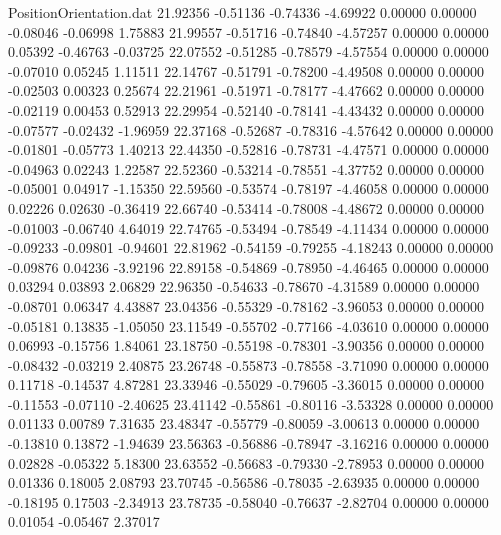 \begin{filecontents}{PositionOrientation.dat}
  21.92356   -0.51136   -0.74336    -4.69922    0.00000    0.00000   -0.08046   -0.06998    1.75883
  21.99557   -0.51716   -0.74840    -4.57257    0.00000    0.00000    0.05392   -0.46763   -0.03725
  22.07552   -0.51285   -0.78579    -4.57554    0.00000    0.00000   -0.07010    0.05245    1.11511
  22.14767   -0.51791   -0.78200    -4.49508    0.00000    0.00000   -0.02503    0.00323    0.25674
  22.21961   -0.51971   -0.78177    -4.47662    0.00000    0.00000   -0.02119    0.00453    0.52913
  22.29954   -0.52140   -0.78141    -4.43432    0.00000    0.00000   -0.07577   -0.02432   -1.96959
  22.37168   -0.52687   -0.78316    -4.57642    0.00000    0.00000   -0.01801   -0.05773    1.40213
  22.44350   -0.52816   -0.78731    -4.47571    0.00000    0.00000   -0.04963    0.02243    1.22587
  22.52360   -0.53214   -0.78551    -4.37752    0.00000    0.00000   -0.05001    0.04917   -1.15350
  22.59560   -0.53574   -0.78197    -4.46058    0.00000    0.00000    0.02226    0.02630   -0.36419
  22.66740   -0.53414   -0.78008    -4.48672    0.00000    0.00000   -0.01003   -0.06740    4.64019
  22.74765   -0.53494   -0.78549    -4.11434    0.00000    0.00000   -0.09233   -0.09801   -0.94601
  22.81962   -0.54159   -0.79255    -4.18243    0.00000    0.00000   -0.09876    0.04236   -3.92196
  22.89158   -0.54869   -0.78950    -4.46465    0.00000    0.00000    0.03294    0.03893    2.06829
  22.96350   -0.54633   -0.78670    -4.31589    0.00000    0.00000   -0.08701    0.06347    4.43887
  23.04356   -0.55329   -0.78162    -3.96053    0.00000    0.00000   -0.05181    0.13835   -1.05050
  23.11549   -0.55702   -0.77166    -4.03610    0.00000    0.00000    0.06993   -0.15756    1.84061
  23.18750   -0.55198   -0.78301    -3.90356    0.00000    0.00000   -0.08432   -0.03219    2.40875
  23.26748   -0.55873   -0.78558    -3.71090    0.00000    0.00000    0.11718   -0.14537    4.87281
  23.33946   -0.55029   -0.79605    -3.36015    0.00000    0.00000   -0.11553   -0.07110   -2.40625
  23.41142   -0.55861   -0.80116    -3.53328    0.00000    0.00000    0.01133    0.00789    7.31635
  23.48347   -0.55779   -0.80059    -3.00613    0.00000    0.00000   -0.13810    0.13872   -1.94639
  23.56363   -0.56886   -0.78947    -3.16216    0.00000    0.00000    0.02828   -0.05322    5.18300
  23.63552   -0.56683   -0.79330    -2.78953    0.00000    0.00000    0.01336    0.18005    2.08793
  23.70745   -0.56586   -0.78035    -2.63935    0.00000    0.00000   -0.18195    0.17503   -2.34913
  23.78735   -0.58040   -0.76637    -2.82704    0.00000    0.00000    0.01054   -0.05467    2.37017

\end{filecontents}
